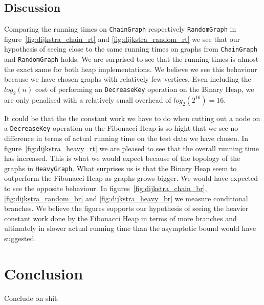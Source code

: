 \documentclass[a4paper,oneside,article,11pt]{memoir}
\begin{document}
\section{Discussion}
Comparing the running times on \texttt{ChainGraph} respectively \texttt{RandomGraph} in figure~\ref{fig:dijkstra_chain_rt} and \ref{fig:dijkstra_random_rt} we see that our hypothesis of seeing close to the same running times on graphs from \texttt{ChainGraph} and \texttt{RandomGraph} holds. We are surprised to see that the running times is almost the exact same for both heap implementations. We believe we see this behaviour because we have chosen graphs with relatively few vertices. Even including the $log_2(n)$ cost of performing an \texttt{DecreaseKey} operation on the Binary Heap, we are only penalised with a relatively small overhead of $log_2(2^{16}) = 16$.


It could be that the the constant work we have to do when cutting out a node on a \texttt{DecreaseKey} operation on the Fibonacci Heap is so hight that we see no difference in terms of actual running time on the test data we have chosen. In figure~\ref{fig:dijkstra_heavy_rt} we are pleased to see that the overall running time has increased. This is what we would expect because of the topology of the graphs in \texttt{HeavyGraph}. What surprises us is that the Binary Heap seem to outperform the Fibonacci Heap as graphs grows bigger. We would have expected to see the opposite behaviour. In figures~\ref{fig:dijkstra_chain_br}, \ref{fig:dijkstra_random_br} and \ref{fig:dijkstra_heavy_br} we measure conditional branches. We believe the figures supports our hypothesis of seeing the heavier constant work done by the Fibonacci Heap in terms of more branches and ultimately in slower actual running time than the asymptotic bound would have suggested.

\chapter{Conclusion}

Conclude on shit.


\end{document}
